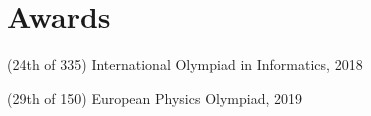 \documentclass[letterpaper,11pt]{article}
\begin{document}
\section*{Awards}
\begin{description}[labelwidth=6em]
    \item[Gold medal] (24th of 335) International Olympiad in Informatics, 2018
    \item[Silver medal] (29th of 150) European Physics Olympiad, 2019
\end{description}
\end{document}
